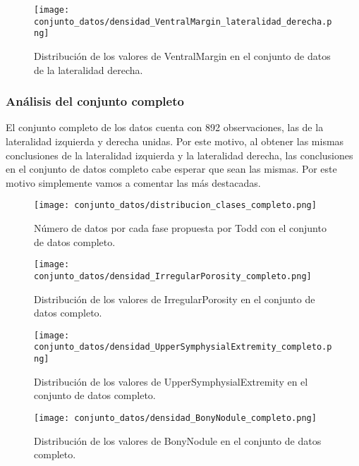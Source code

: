 \begin{figure}[H]
	\centering
	\texttt{[image: conjunto\_datos/densidad\_VentralMargin\_lateralidad\_derecha.png]}
	\caption{Distribución de los valores de VentralMargin en el conjunto de datos de la lateralidad derecha.}
	\label{fig:densidad_VentralMargin_derecha}
\end{figure}

\subsubsection{Análisis del conjunto completo}

El conjunto completo de los datos cuenta con 892 observaciones, las de la lateralidad izquierda y derecha unidas. Por este motivo, al obtener las mismas conclusiones de la lateralidad izquierda y la lateralidad derecha, las conclusiones en el conjunto de datos completo cabe esperar que sean las mismas. Por este motivo simplemente vamos a comentar las más destacadas.

\begin{figure}[H]
	\centering
	\texttt{[image: conjunto\_datos/distribucion\_clases\_completo.png]}
	\caption{Número de datos por cada fase propuesta por Todd con el conjunto de datos completo.}
	\label{fig:conteo_c}
\end{figure}


\begin{figure}[H]
	\centering
	\texttt{[image: conjunto\_datos/densidad\_IrregularPorosity\_completo.png]}
	\caption{Distribución de los valores de IrregularPorosity en el conjunto de datos completo.}
	\label{fig:densidad_IrregularPorosity_completo}
\end{figure}

\begin{figure}[H]
	\centering
	\texttt{[image: conjunto\_datos/densidad\_UpperSymphysialExtremity\_completo.png]}
	\caption{Distribución de los valores de UpperSymphysialExtremity en el conjunto de datos completo.}
	\label{fig:densidad_UpperSymphysialExtremity_completo}
\end{figure}


\begin{figure}[H]
	\centering
	\texttt{[image: conjunto\_datos/densidad\_BonyNodule\_completo.png]}
	\caption{Distribución de los valores de BonyNodule en el conjunto de datos completo.}
	\label{fig:densidad_BonyNodule_completo}
\end{figure}



